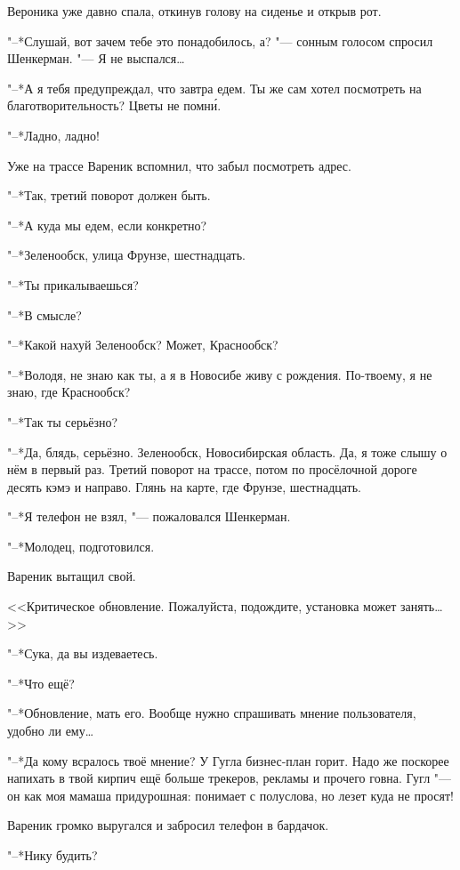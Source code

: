\textspace

\label{Sun_2012_05_13}

Вероника уже давно спала, откинув голову на сиденье и открыв рот.

"--*Слушай, вот зачем тебе это понадобилось, а? "--- сонным голосом спросил Шенкерман.
"--- Я не выспался\ldots{}

"--*А я тебя предупреждал, что завтра едем.
Ты же сам хотел посмотреть на благотворительность?
Цветы не помн\'и.

"--*Ладно, ладно!

Уже на трассе Вареник вспомнил, что забыл посмотреть адрес.

"--*Так, третий поворот должен быть.

"--*А куда мы едем, если конкретно?

"--*Зеленообск, улица Фрунзе, шестнадцать.

"--*Ты прикалываешься?

"--*В смысле?

"--*Какой нахуй Зеленообск?
Может, Краснообск?

"--*Володя, не знаю как ты, а я в Новосибе живу с рождения.
По-твоему, я не знаю, где Краснообск?

"--*Так ты серьёзно?

"--*Да, блядь, серьёзно.
Зеленообск, Новосибирская область.
Да, я тоже слышу о нём в первый раз.
Третий поворот на трассе, потом по просёлочной дороге десять кэмэ и направо.
Глянь на карте, где Фрунзе, шестнадцать.

"--*Я телефон не взял, "--- пожаловался Шенкерман.

"--*Молодец, подготовился.

Вареник вытащил свой.

<<Критическое обновление.
Пожалуйста, подождите, установка может занять\ldots{}>>

"--*Сука, да вы издеваетесь.

"--*Что ещё?

"--*Обновление, мать его.
Вообще нужно спрашивать мнение пользователя, удобно ли ему\ldots{}

"--*Да кому всралось твоё мнение?
У Гугла бизнес-план горит.
Надо же поскорее напихать в твой кирпич ещё больше трекеров, рекламы и прочего говна.
Гугл "--- он как моя мамаша придурошная: понимает с полуслова, но лезет куда не просят!

Вареник громко выругался и забросил телефон в бардачок.

"--*Нику будить?

